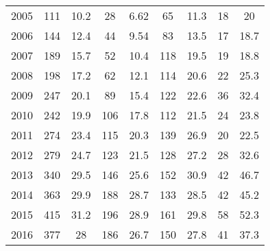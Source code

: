 \begin{table}[htbp]
\begin{tabular}{l*{8}{c}}
2005      &      111&     10.2&       28&     6.62&       65&     11.3&       18&       20\\
2006      &      144&     12.4&       44&     9.54&       83&     13.5&       17&     18.7\\
2007      &      189&     15.7&       52&     10.4&      118&     19.5&       19&     18.8\\
2008      &      198&     17.2&       62&     12.1&      114&     20.6&       22&     25.3\\
2009      &      247&     20.1&       89&     15.4&      122&     22.6&       36&     32.4\\
2010      &      242&     19.9&      106&     17.8&      112&     21.5&       24&     23.8\\
2011      &      274&     23.4&      115&     20.3&      139&     26.9&       20&     22.5\\
2012      &      279&     24.7&      123&     21.5&      128&     27.2&       28&     32.6\\
2013      &      340&     29.5&      146&     25.6&      152&     30.9&       42&     46.7\\
2014      &      363&     29.9&      188&     28.7&      133&     28.5&       42&     45.2\\
2015      &      415&     31.2&      196&     28.9&      161&     29.8&       58&     52.3\\
2016      &      377&       28&      186&     26.7&      150&     27.8&       41&     37.3\\
\hline\hline
\end{tabular}
\end{table}
